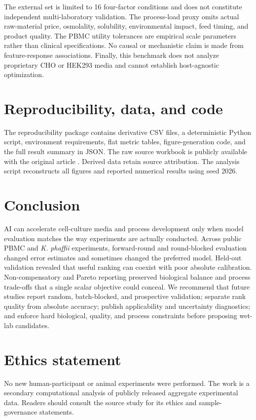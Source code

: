 \documentclass[11pt]{article}
\newcommand{\kp}{\textit{K. phaffii}}
\begin{document}
The external set is limited to 16 four-factor conditions and does not constitute independent multi-laboratory validation. The process-load proxy omits actual raw-material price, osmolality, solubility, environmental impact, feed timing, and product quality. The PBMC utility tolerances are empirical scale parameters rather than clinical specifications. No causal or mechanistic claim is made from feature-response associations. Finally, this benchmark does not analyze proprietary CHO or HEK293 media and cannot establish host-agnostic optimization.

\section{Reproducibility, data, and code}
The reproducibility package contains derivative CSV files, a deterministic Python script, environment requirements, flat metric tables, figure-generation code, and the full result summary in JSON. The raw source workbook is publicly available with the original article \cite{narayanan2025}. Derived data retain source attribution. The analysis script reconstructs all figures and reported numerical results using seed 2026.

\section{Conclusion}
AI can accelerate cell-culture media and process development only when model evaluation matches the way experiments are actually conducted. Across public PBMC and \kp{} experiments, forward-round and round-blocked evaluation changed error estimates and sometimes changed the preferred model. Held-out validation revealed that useful ranking can coexist with poor absolute calibration. Non-compensatory and Pareto reporting preserved biological balance and process trade-offs that a single scalar objective could conceal. We recommend that future studies report random, batch-blocked, and prospective validation; separate rank quality from absolute accuracy; publish applicability and uncertainty diagnostics; and enforce hard biological, quality, and process constraints before proposing wet-lab candidates.

\section*{Ethics statement}
No new human-participant or animal experiments were performed. The work is a secondary computational analysis of publicly released aggregate experimental data. Readers should consult the source study for its ethics and sample-governance statements.
\end{document}
